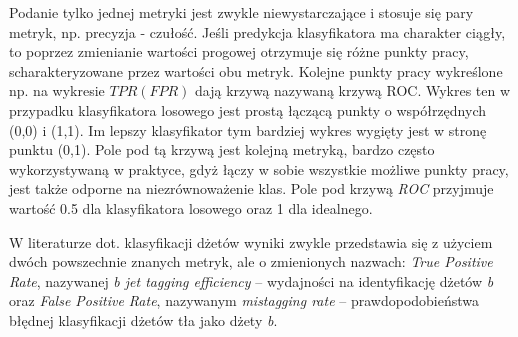 \begin{appendices}
Podanie tylko jednej metryki jest zwykle niewystarczające i stosuje się pary metryk, np. precyzja - czułość. Jeśli predykcja klasyfikatora ma charakter ciągły, to poprzez zmienianie wartości progowej otrzymuje się różne punkty pracy, scharakteryzowane przez wartości obu metryk. Kolejne punkty pracy wykreślone np. na wykresie $TPR(FPR)$ dają krzywą nazywaną krzywą ROC. 
Wykres ten w przypadku klasyfikatora losowego jest prostą łączącą punkty o współrzędnych (0,0) i (1,1). Im lepszy klasyfikator tym bardziej wykres wygięty jest w stronę punktu (0,1).
Pole pod tą krzywą  jest kolejną metryką, bardzo często wykorzystywaną w praktyce, gdyż łączy w sobie wszystkie możliwe punkty pracy, jest także odporne na niezrównoważenie klas. Pole pod krzywą \textit{ROC} przyjmuje wartość 0.5 dla klasyfikatora losowego oraz 1 dla idealnego.

W literaturze dot. klasyfikacji dżetów wyniki zwykle przedstawia się z użyciem dwóch powszechnie znanych metryk, ale o zmienionych nazwach:
\textit{True Positive Rate}, nazywanej \textit{b jet tagging efficiency} -- wydajności na identyfikację dżetów \textit{b} oraz \textit{False Positive Rate}, nazywanym \textit{mistagging rate}  -- prawdopodobieństwa błędnej klasyfikacji dżetów tła jako dżety \textit{b}.

\clearpage
\FloatBarrier

\end{appendices}
